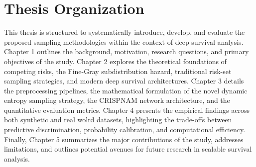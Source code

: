 \documentclass[a4paper,twoside,12pt]{report}
\begin{document}

\section{Thesis Organization}
This thesis is structured to systematically introduce, develop, and evaluate the proposed sampling methodologies within the context of deep survival analysis. Chapter 1 outlines the background, motivation, research questions, and primary objectives of the study. Chapter 2 explores the theoretical foundations of competing risks, the Fine-Gray subdistribution hazard, traditional risk-set sampling strategies, and modern deep survival architectures. Chapter 3 details the preprocessing pipelines, the mathematical formulation of the novel dynamic entropy sampling strategy, the CRISPNAM network architecture, and the quantitative evaluation metrics. Chapter 4 presents the empirical findings across both synthetic and real wolrd datasets, highlighting the trade-offs between predictive discrimination, probability calibration, and computational efficiency. Finally, Chapter 5 summarizes the major contributions of the study, addresses limitations, and outlines potential avenues for future research in scalable survival analysis.
\end{document}

